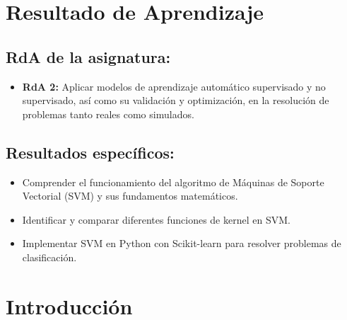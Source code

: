 \documentclass[a4,11pt]{aleph-notas}
\begin{document}
\encabezado


\section*{Resultado de Aprendizaje}

\subsection*{RdA de la asignatura:}
\begin{itemize}[leftmargin=*]
    \item \textbf{RdA 2:} 
    Aplicar modelos de aprendizaje automático supervisado y no supervisado, así como su validación y optimización, en la resolución de problemas tanto reales como simulados.
\end{itemize}

\subsection*{Resultados específicos:}  
\begin{itemize}[leftmargin=*]  
    \item Comprender el funcionamiento del algoritmo de Máquinas de Soporte Vectorial (SVM) y sus fundamentos matemáticos.  
    \item Identificar y comparar diferentes funciones de kernel en SVM.  
    \item Implementar SVM en Python con Scikit-learn para resolver problemas de clasificación.  
\end{itemize}  

\section*{Introducción}  
\end{document}
